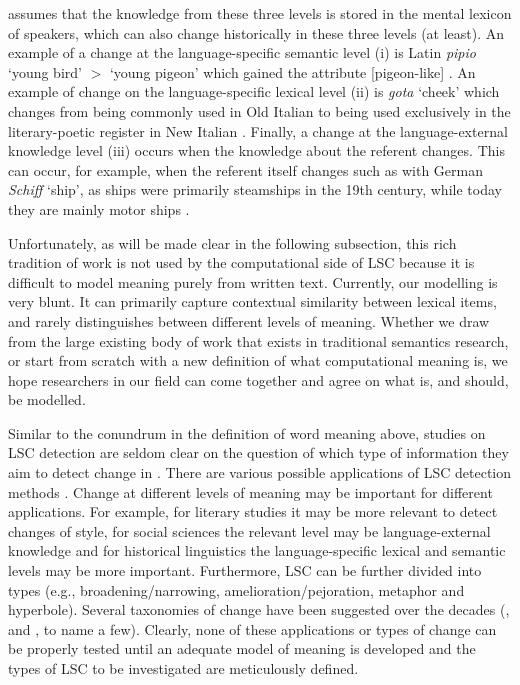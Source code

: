 \documentclass[output=paper]{langscibook}
\begin{document}
\citet{blank97xvi} assumes that the knowledge from these three levels is stored in the mental lexicon of speakers, which can also change historically in these three levels (at least). An example of a change at the language-specific semantic level (i) is Latin \textit{pipio} `young bird' $>$ `young pigeon' which gained the attribute [pigeon-like] \citep[][106--107]{blank97xvi}. An example of change on the language-specific lexical level (ii) is \textit{gota} `cheek' which changes from being commonly used  in Old Italian to being used exclusively in the literary-poetic register in New Italian \citep[][107]{blank97xvi}. 
Finally, a change at the language-external knowledge level (iii) occurs when the knowledge about the referent changes. This can occur, for example, when the referent itself changes such as with German \textit{Schiff} `ship', as ships were primarily steamships in the 19th century, while today they are mainly motor ships \citep[][111]{blank97xvi}. 

Unfortunately, as will be made clear in the following subsection, this rich tradition of work is not used by the computational side of LSC because it is difficult to model meaning purely from written text. Currently, our modelling is very blunt. It can primarily capture contextual similarity between lexical items, and rarely distinguishes between different levels of meaning. Whether we draw from the large existing body of work that exists in traditional semantics research, or start from scratch with a new definition of what computational meaning is, we hope researchers in our field can come together and agree on what is, and should, be modelled. 

Similar to the conundrum in the definition of word meaning above, studies on LSC detection are seldom clear on the question of which type of information they aim to detect change in \citep{schlechtwegwalde20}. 
There are various possible applications of LSC detection methods \citep[e.g.][]{hamilton-etal-2016-cultural,voigt6521,kutuzov-etal-2017-temporal,hengchen2019nation}. Change at different levels of meaning may be important for different applications. For example, for literary studies it may be more relevant to detect changes of style, for social sciences the relevant level may be language-external knowledge and for historical linguistics the language-specific lexical and semantic levels may be more important.
Furthermore, LSC can be further divided into types (e.g., broadening/narrowing, amelioration/pejoration, metaphor and hyperbole). Several taxonomies of change have been suggested over the decades (\citealt{breal1897essai}, \citealt{bloomfield-1933} and \citealt{blank1999new}, to name a few). Clearly, none of these applications or types of change can be properly tested until an adequate model of meaning is developed and the types of LSC to be investigated are meticulously defined.
\end{document}
